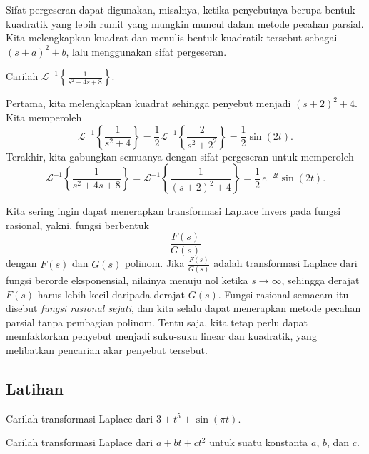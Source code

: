 Sifat pergeseran dapat digunakan, misalnya, ketika penyebutnya berupa
bentuk kuadratik yang lebih rumit yang mungkin muncul dalam metode pecahan
parsial.  Kita melengkapkan kuadrat dan menulis bentuk kuadratik tersebut sebagai ${(s+a)}^2+b$,
lalu menggunakan sifat pergeseran.

\begin{example}
Carilah
${\mathcal{L}}^{-1} \left\{ \frac{1}{s^2+4s+8} \right\}$.

Pertama, kita melengkapkan kuadrat sehingga penyebut menjadi ${(s+2)}^2+4$.  
Kita memperoleh
\begin{equation*}
{\mathcal{L}}^{-1} \left\{ \frac{1}{s^2+4} \right\}
=
\frac{1}{2}
{\mathcal{L}}^{-1} \left\{ \frac{2}{s^2+2^2} \right\}
=
\frac{1}{2} \sin (2t) .
\end{equation*}
Terakhir, kita gabungkan semuanya dengan sifat pergeseran untuk memperoleh
\begin{equation*}
{\mathcal{L}}^{-1} \left\{ \frac{1}{s^2+4s+8} \right\} = 
{\mathcal{L}}^{-1} \left\{ \frac{1}{{(s+2)}^2+4} \right\}
=
\frac{1}{2}\,e^{-2t} \sin (2t) .
\end{equation*}
\end{example}

Kita sering ingin dapat menerapkan transformasi Laplace invers pada
fungsi rasional, yakni, fungsi berbentuk
\begin{equation*}
\frac{F(s)}{G(s)}
\end{equation*}
dengan $F(s)$ dan $G(s)$ polinom.  Jika $\frac{F(s)}{G(s)}$ adalah
transformasi Laplace dari fungsi berorde eksponensial,
nilainya menuju nol ketika $s \to \infty$, sehingga derajat $F(s)$
harus lebih kecil daripada derajat $G(s)$.  Fungsi rasional semacam itu
disebut \emph{fungsi rasional sejati},
dan kita selalu dapat menerapkan metode pecahan parsial tanpa pembagian
polinom.
Tentu saja, kita tetap perlu dapat memfaktorkan penyebut menjadi
suku-suku linear dan kuadratik, yang melibatkan pencarian akar
penyebut tersebut.

\subsection{Latihan}

\begin{exercise}
Carilah transformasi Laplace dari $3+t^5+\sin (\pi t)$.
\end{exercise}

\begin{exercise}
Carilah transformasi Laplace dari $a+bt+ct^2$ untuk suatu konstanta $a$, $b$, dan
$c$.
\end{exercise}

